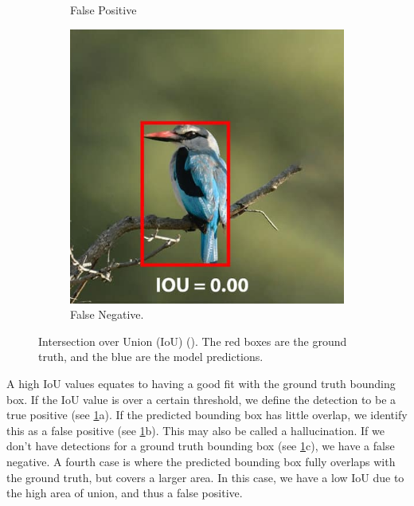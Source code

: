 \begin{figure}[H]
\begin{subfigure}{0.32\textwidth}
        \caption{\centering False Positive}
    \end{subfigure}
    \hfill
    \begin{subfigure}{0.32\textwidth}
        \centering
        \includegraphics[width=\textwidth]{Images/iou_right.png}
        \caption{\centering False Negative.}
    \end{subfigure}
    \centering
    \caption[Intersection over Union (IoU) (\cite{learnopencv_iou}).]{\centering Intersection over Union (IoU) (\cite{learnopencv_iou}). The red boxes are the ground truth, and the blue are the model predictions.}
    \label{fig:IoU}
\end{figure}

A high IoU values equates to having a good fit with the ground truth bounding box. If the IoU value is over a certain threshold, we define the detection to be a true positive (see \ref{fig:IoU}a). If the predicted bounding box has little overlap, we identify this as a false positive (see \ref{fig:IoU}b). This may also be called a hallucination. If we don't have detections for a ground truth bounding box (see \ref{fig:IoU}c), we have a false negative. A fourth case is where the predicted bounding box fully overlaps with the ground truth, but covers a larger area. In this case, we have a low IoU due to the high area of union, and thus a false positive. 

